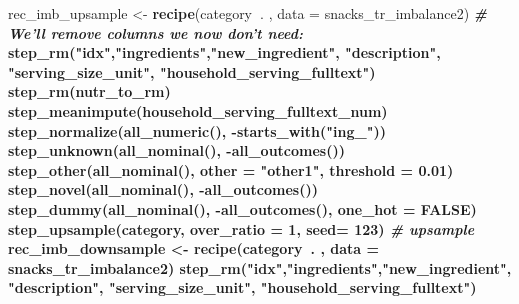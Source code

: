 \documentclass[
]{article}
\newenvironment{Shaded}{\begin{snugshade}}{\end{snugshade}}
\newcommand{\CommentTok}[1]{\textcolor[rgb]{0.56,0.35,0.01}{\textit{#1}}}
\newcommand{\DataTypeTok}[1]{\textcolor[rgb]{0.13,0.29,0.53}{#1}}
\newcommand{\DecValTok}[1]{\textcolor[rgb]{0.00,0.00,0.81}{#1}}
\newcommand{\FloatTok}[1]{\textcolor[rgb]{0.00,0.00,0.81}{#1}}
\newcommand{\KeywordTok}[1]{\textcolor[rgb]{0.13,0.29,0.53}{\textbf{#1}}}
\newcommand{\NormalTok}[1]{#1}
\newcommand{\OperatorTok}[1]{\textcolor[rgb]{0.81,0.36,0.00}{\textbf{#1}}}
\newcommand{\OtherTok}[1]{\textcolor[rgb]{0.56,0.35,0.01}{#1}}
\newcommand{\StringTok}[1]{\textcolor[rgb]{0.31,0.60,0.02}{#1}}
\begin{document}
\begin{Shaded}
\begin{Highlighting}[]
\NormalTok{rec_imb_upsample <-}\StringTok{ }\KeywordTok{recipe}\NormalTok{(category}\OperatorTok{~}\NormalTok{. , }\DataTypeTok{data =}\NormalTok{ snacks_tr_imbalance2) }\OperatorTok{%>%}
\StringTok{  }\CommentTok{# We'll remove columns we now don't need:}
\StringTok{  }\KeywordTok{step_rm}\NormalTok{(}\StringTok{"idx"}\NormalTok{,}\StringTok{"ingredients"}\NormalTok{,}\StringTok{"new_ingredient"}\NormalTok{, }\StringTok{"description"}\NormalTok{, }\StringTok{"serving_size_unit"}\NormalTok{, }\StringTok{"household_serving_fulltext"}\NormalTok{) }\OperatorTok{%>%}
\StringTok{  }\KeywordTok{step_rm}\NormalTok{(nutr_to_rm) }\OperatorTok{%>%}
\StringTok{  }\KeywordTok{step_meanimpute}\NormalTok{(household_serving_fulltext_num) }\OperatorTok{%>%}\StringTok{ }\CommentTok{# Impute average instead of NA's:}
\StringTok{  }\KeywordTok{step_normalize}\NormalTok{(}\KeywordTok{all_numeric}\NormalTok{(), }\OperatorTok{-}\KeywordTok{starts_with}\NormalTok{(}\StringTok{"ing_"}\NormalTok{)) }\OperatorTok{%>%}\StringTok{ }\CommentTok{# normalize}
\StringTok{  }\KeywordTok{step_unknown}\NormalTok{(}\KeywordTok{all_nominal}\NormalTok{(), }\OperatorTok{-}\KeywordTok{all_outcomes}\NormalTok{()) }\OperatorTok{%>%}\StringTok{ }\CommentTok{# unknown instead of NA's, other for uncomoon values:}
\StringTok{  }\KeywordTok{step_other}\NormalTok{(}\KeywordTok{all_nominal}\NormalTok{(), }\DataTypeTok{other =} \StringTok{"other1"}\NormalTok{, }\DataTypeTok{threshold =} \FloatTok{0.01}\NormalTok{) }\OperatorTok{%>%}
\StringTok{  }\KeywordTok{step_novel}\NormalTok{(}\KeywordTok{all_nominal}\NormalTok{(), }\OperatorTok{-}\KeywordTok{all_outcomes}\NormalTok{()) }\OperatorTok{%>%}\StringTok{ }\CommentTok{# step novel for possible new categories in val set:}
\StringTok{  }\KeywordTok{step_dummy}\NormalTok{(}\KeywordTok{all_nominal}\NormalTok{(), }\OperatorTok{-}\KeywordTok{all_outcomes}\NormalTok{(), }\DataTypeTok{one_hot =} \OtherTok{FALSE}\NormalTok{) }\OperatorTok{%>%}\StringTok{ }\CommentTok{# step dummy for categorical features:}
\StringTok{  }\KeywordTok{step_upsample}\NormalTok{(category, }\DataTypeTok{over_ratio =} \DecValTok{1}\NormalTok{, }\DataTypeTok{seed=} \DecValTok{123}\NormalTok{) }\CommentTok{# upsample }
\NormalTok{rec_imb_downsample <-}\StringTok{ }\KeywordTok{recipe}\NormalTok{(category}\OperatorTok{~}\NormalTok{. , }\DataTypeTok{data =}\NormalTok{ snacks_tr_imbalance2) }\OperatorTok{%>%}
\StringTok{  }\KeywordTok{step_rm}\NormalTok{(}\StringTok{"idx"}\NormalTok{,}\StringTok{"ingredients"}\NormalTok{,}\StringTok{"new_ingredient"}\NormalTok{, }\StringTok{"description"}\NormalTok{, }\StringTok{"serving_size_unit"}\NormalTok{, }\StringTok{"household_serving_fulltext"}\NormalTok{) }\OperatorTok{%>%}
}}}}}}}}}}}
\end{Highlighting}
\end{Shaded}
\end{document}
